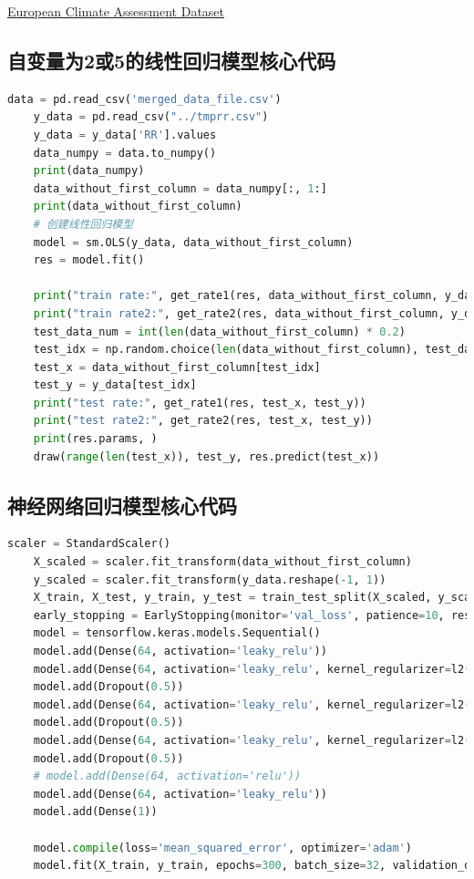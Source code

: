 \documentclass[UTF8, a4paper]{ctexart}
\begin{document}
\href{https://www.ecad.eu/}{European Climate Assessment  Dataset}

\subsection{自变量为2或5的线性回归模型核心代码}

\begin{lstlisting}[language=Python]
	data = pd.read_csv('merged_data_file.csv')
	y_data = pd.read_csv("../tmprr.csv")
	y_data = y_data['RR'].values
	data_numpy = data.to_numpy()
	print(data_numpy)
	data_without_first_column = data_numpy[:, 1:]
	print(data_without_first_column)
	# 创建线性回归模型
	model = sm.OLS(y_data, data_without_first_column)
	res = model.fit()
	
	print("train rate:", get_rate1(res, data_without_first_column, y_data))
	print("train rate2:", get_rate2(res, data_without_first_column, y_data))
	test_data_num = int(len(data_without_first_column) * 0.2)
	test_idx = np.random.choice(len(data_without_first_column), test_data_num, replace=False)
	test_x = data_without_first_column[test_idx]
	test_y = y_data[test_idx]
	print("test rate:", get_rate1(res, test_x, test_y))
	print("test rate2:", get_rate2(res, test_x, test_y))
	print(res.params, )
	draw(range(len(test_x)), test_y, res.predict(test_x))
\end{lstlisting}

\subsection{神经网络回归模型核心代码}
\begin{lstlisting}[language=Python]
	scaler = StandardScaler()
	X_scaled = scaler.fit_transform(data_without_first_column)
	y_scaled = scaler.fit_transform(y_data.reshape(-1, 1))
	X_train, X_test, y_train, y_test = train_test_split(X_scaled, y_scaled, test_size=0.2, random_state=42)
	early_stopping = EarlyStopping(monitor='val_loss', patience=10, restore_best_weights=True)
	model = tensorflow.keras.models.Sequential()
	model.add(Dense(64, activation='leaky_relu'))
	model.add(Dense(64, activation='leaky_relu', kernel_regularizer=l2(0.01)))
	model.add(Dropout(0.5))
	model.add(Dense(64, activation='leaky_relu', kernel_regularizer=l2(0.02)))
	model.add(Dropout(0.5))
	model.add(Dense(64, activation='leaky_relu', kernel_regularizer=l2(0.02)))
	model.add(Dropout(0.5))
	# model.add(Dense(64, activation='relu'))
	model.add(Dense(64, activation='leaky_relu'))
	model.add(Dense(1))
	
	model.compile(loss='mean_squared_error', optimizer='adam')
	model.fit(X_train, y_train, epochs=300, batch_size=32, validation_data=(X_test, y_test), callbacks=[early_stopping])
\end{lstlisting}
\end{document}
